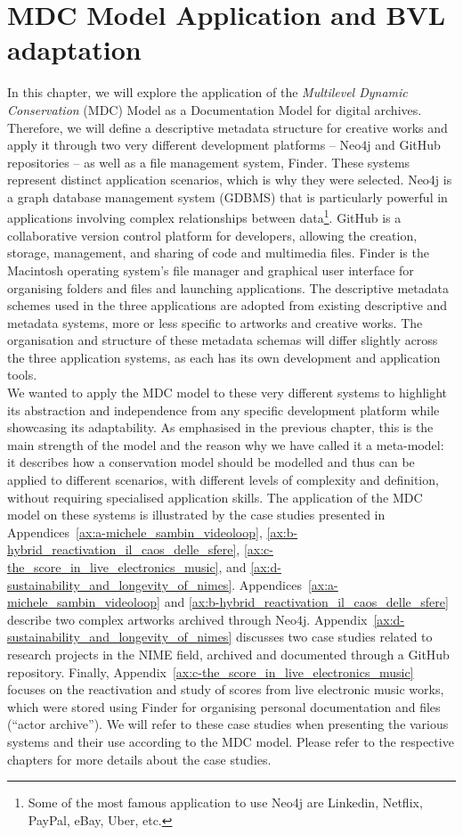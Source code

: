 \chapter{\label{ch:4-madc_model_application}MDC Model Application and BVL adaptation}

In this chapter, we will explore the application of the \textit{Multilevel Dynamic Conservation} (MDC) Model as a Documentation Model for digital archives. Therefore, we will define a descriptive metadata structure for creative works and apply it through two very different development platforms – Neo4j and GitHub repositories – as well as a file management system, Finder. These systems represent distinct application scenarios, which is why they were selected. Neo4j is a graph database management system (GDBMS) that is particularly powerful in applications involving complex relationships between data\footnote{Some of the most famous application to use Neo4j are Linkedin, Netflix, PayPal, eBay, Uber, etc.}. GitHub is a collaborative version control platform for developers, allowing the creation, storage, management, and sharing of code and multimedia files. Finder is the Macintosh operating system's file manager and graphical user interface for organising folders and files and launching applications. The descriptive metadata schemes used in the three applications are adopted from existing descriptive and metadata systems, more or less specific to artworks and creative works. The organisation and structure of these metadata schemas will differ slightly across the three application systems, as each has its own development and application tools.\\
We wanted to apply the MDC model to these very different systems to highlight its abstraction and independence from any specific development platform while showcasing its adaptability. As emphasised in the previous chapter, this is the main strength of the model and the reason why we have called it a meta-model: it describes how a conservation model should be modelled and thus can be applied to different scenarios, with different levels of complexity and definition, without requiring specialised application skills. The application of the MDC model on these systems is illustrated by the case studies presented in Appendices~\ref{ax:a-michele_sambin_videoloop}, \ref{ax:b-hybrid_reactivation_il_caos_delle_sfere}, \ref{ax:c-the_score_in_live_electronics_music}, and \ref{ax:d-sustainability_and_longevity_of_nimes}. Appendices~\ref{ax:a-michele_sambin_videoloop} and \ref{ax:b-hybrid_reactivation_il_caos_delle_sfere} describe two complex artworks archived through Neo4j. Appendix~\ref{ax:d-sustainability_and_longevity_of_nimes} discusses two case studies related to research projects in the NIME field, archived and documented through a GitHub repository. Finally, Appendix~\ref{ax:c-the_score_in_live_electronics_music} focuses on the reactivation and study of scores from live electronic music works, which were stored using Finder for organising personal documentation and files (``actor archive''). We will refer to these case studies when presenting the various systems and their use according to the MDC model. Please refer to the respective chapters for more details about the case studies.\\
